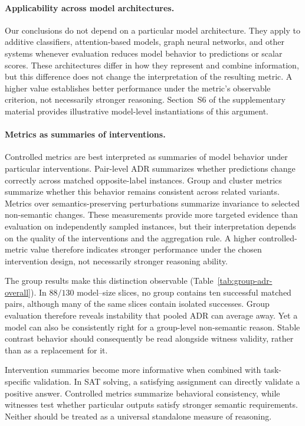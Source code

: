\documentclass[acmsmall,screen,review,anonymous]{acmart}
\begin{document}
\paragraph{Applicability across model architectures.}
Our conclusions do not depend on a particular model architecture. They apply
to additive classifiers, attention-based models, graph neural networks, and
other systems whenever evaluation reduces model behavior to predictions or
scalar scores. These architectures differ in how they represent and combine
information, but this difference does not change the interpretation of the
resulting metric. A higher value establishes better performance under the
metric's observable criterion, not necessarily stronger reasoning.
Section~S6 of the supplementary material provides illustrative model-level
instantiations of this argument.

\paragraph{Metrics as summaries of interventions.}
Controlled metrics are best interpreted as summaries of model behavior under
particular interventions. Pair-level ADR summarizes whether predictions
change correctly across matched opposite-label instances. Group and cluster
metrics summarize whether this behavior remains consistent across related
variants. Metrics over semantics-preserving perturbations summarize
invariance to selected non-semantic changes. These measurements provide more
targeted evidence than evaluation on independently sampled instances, but
their interpretation depends on the quality of the interventions and the
aggregation rule. A higher controlled-metric value therefore indicates
stronger performance under the chosen intervention design, not necessarily
stronger reasoning ability.

The group results make this distinction observable
(Table~\ref{tab:group-adr-overall}). In \(88/130\)
model--size slices, no group contains ten successful matched pairs, although
many of the same slices contain isolated successes. Group evaluation therefore
reveals instability that pooled ADR can average away. Yet a model can also be
consistently right for a group-level non-semantic reason. Stable contrast
behavior should consequently be read alongside witness validity, rather than
as a replacement for it.

Intervention summaries become more informative when combined with
task-specific validation. In SAT solving, a satisfying assignment can
directly validate a positive answer. Controlled metrics summarize behavioral
consistency,
while witnesses test whether particular outputs satisfy stronger semantic
requirements. Neither should be treated as a universal standalone measure of
reasoning.
\end{document}
